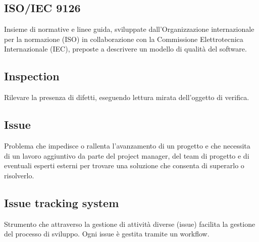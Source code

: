 \documentclass[../glossario.tex]{subfiles}
\begin{document}
\subsection*{ISO/IEC 9126}
{}
Insieme di normative e linee guida, sviluppate dall’Organizzazione internazionale per la normazione (ISO) in collaborazione con la Commissione Elettrotecnica Internazionale (IEC), preposte a descrivere un modello di qualità del software.

\subsection*{Inspection}
{}
Rilevare la presenza di difetti, eseguendo lettura mirata dell’oggetto di verifica.

\subsection*{Issue}
{}
Problema che impedisce o rallenta l'avanzamento di un progetto e che necessita di un lavoro aggiuntivo da parte del project manager, del team di progetto e di eventuali esperti esterni per trovare una soluzione che consenta di superarlo o risolverlo.

\subsection*{Issue tracking system}
{}
Strumento che attraverso la gestione di attività diverse (issue) facilita la gestione del processo di sviluppo. Ogni issue è gestita tramite un workflow.
\end{document}
